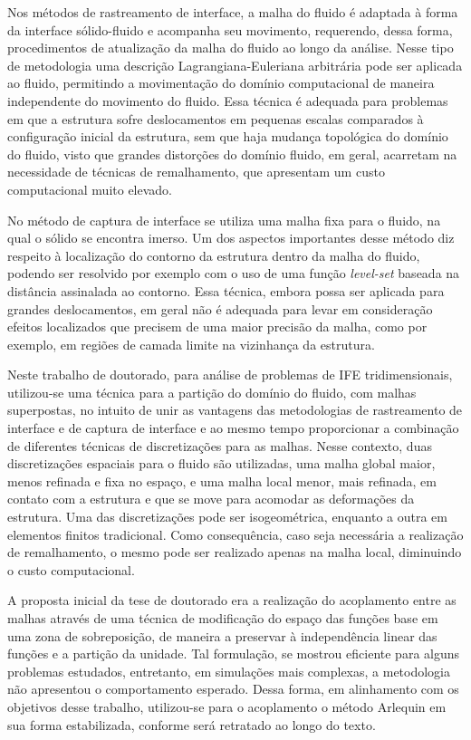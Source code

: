 \documentclass[tese_patricia.tex]{subfiles}
\begin{document}
Nos métodos de rastreamento de interface, a malha do fluido é adaptada à forma da interface sólido-fluido e acompanha seu movimento, requerendo, dessa forma, procedimentos de atualização da malha do fluido ao longo da análise. Nesse tipo de metodologia uma descrição Lagrangiana-Euleriana arbitrária pode ser aplicada ao fluido, permitindo a movimentação do domínio computacional de maneira independente do movimento do fluido. Essa técnica é adequada para problemas em que a estrutura sofre deslocamentos em pequenas escalas comparados à configuração inicial da estrutura, sem que haja mudança topológica do domínio do fluido, visto que grandes distorções do domínio fluido, em geral, acarretam na necessidade de técnicas de remalhamento, que apresentam um custo computacional muito elevado.

No método de captura de interface se utiliza uma malha fixa para o fluido, na qual o sólido se encontra imerso. Um dos aspectos importantes desse método diz respeito à localização do contorno da estrutura dentro da malha do fluido, podendo ser resolvido por exemplo com o uso de uma função \textit{level-set} baseada na distância assinalada ao contorno. Essa técnica, embora possa ser aplicada para grandes deslocamentos, em geral não é adequada para levar em consideração efeitos localizados que precisem de uma maior precisão da malha, como por exemplo, em regiões de camada limite na vizinhança da estrutura. 

Neste trabalho de doutorado, para análise de problemas de IFE tridimensionais, utilizou-se uma técnica para a partição do domínio do fluido, com malhas superpostas, no intuito de unir as vantagens das metodologias de rastreamento de interface e de captura de interface e ao mesmo tempo proporcionar a combinação de diferentes técnicas de discretizações para as malhas. Nesse contexto, duas discretizações espaciais para o fluido são utilizadas, uma malha global maior, menos refinada e fixa no espaço, e uma malha local menor, mais refinada, em contato com a estrutura e que se move para acomodar as deformações da estrutura. Uma das discretizações pode ser isogeométrica, enquanto a outra em elementos finitos tradicional. Como consequência, caso seja necessária a realização de remalhamento, o mesmo pode ser realizado apenas na malha local, diminuindo o custo computacional. 

A proposta inicial da tese de doutorado era a realização do acoplamento entre as malhas através de uma técnica de modificação do espaço das funções base em uma zona de sobreposição, de maneira a preservar à independência linear das funções e a partição da unidade. Tal formulação, se mostrou eficiente para alguns problemas estudados, entretanto, em simulações mais complexas, a metodologia não apresentou o comportamento esperado. Dessa forma, em alinhamento com os objetivos desse trabalho, utilizou-se para o acoplamento o método Arlequin em sua forma estabilizada, conforme será retratado ao longo do texto. 
\end{document}
